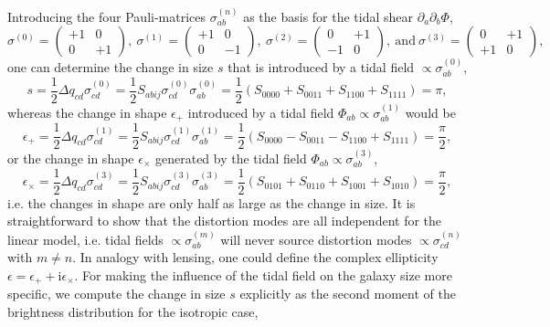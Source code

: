 \documentclass[a4paper,fleqn,usenatbib]{mnras}
\newcommand{\ci}{\mathrm{i}}
\begin{document}
Introducing the four Pauli-matrices $\sigma^{(n)}_{ab}$ as the basis for the tidal shear $\partial_a\partial_b\Phi$,
\begin{equation}
\sigma^{(0)} = \left(
\begin{array}{cc}
+1 & 0 \\ 0 & +1
\end{array}
\right),~
\sigma^{(1)} = \left(
\begin{array}{cc}
+1 & 0 \\ 0 & -1
\end{array}
\right),~
\sigma^{(2)} = \left(
\begin{array}{cc}
0 & +1 \\ -1 & 0
\end{array}
\right),
\mathrm{~and~}
\sigma^{(3)} = \left(
\begin{array}{cc}
0 & +1 \\ +1 & 0
\end{array}
\right),
\end{equation}
one can determine the change in size $s$ that is introduced by a tidal field $\propto\sigma_{ab}^{(0)}$,
\begin{equation}
s = 
\frac{1}{2}\Delta q_{cd}\sigma^{(0)}_{cd} = 
\frac{1}{2}S_{abij}\sigma^{(0)}_{cd}\sigma^{(0)}_{ab} = 
\frac{1}{2}\left(S_{0000} + S_{0011} + S_{1100} + S_{1111}\right) = 
\pi,
\end{equation}
whereas the change in shape $\epsilon_+$ introduced by a tidal field $\Phi_{ab}\propto\sigma^{(1)}_{ab}$ would be
\begin{equation}
\epsilon_+ = 
\frac{1}{2}\Delta q_{cd}\sigma^{(1)}_{cd} = 
\frac{1}{2}S_{abij}\sigma^{(1)}_{cd}\sigma^{(1)}_{ab} = 
\frac{1}{2}\left(S_{0000} - S_{0011} - S_{1100} + S_{1111}\right) =
\frac{\pi}{2},
\end{equation}
or the change in shape $\epsilon_\times$ generated by the tidal field $\Phi_{ab}\propto\sigma^{(3)}_{ab}$,
\begin{equation}
\epsilon_\times = 
\frac{1}{2}\Delta q_{cd}\sigma^{(3)}_{cd} =
\frac{1}{2}S_{abij}\sigma^{(3)}_{cd}\sigma^{(3)}_{ab} = 
\frac{1}{2}\left(S_{0101} + S_{0110} + S_{1001} + S_{1010}\right) = 
\frac{\pi}{2},
\end{equation}
i.e. the changes in shape are only half as large as the change in size. It is straightforward to show that the distortion modes are all independent for the linear model, i.e. tidal fields $\propto\sigma^{(m)}_{ab}$ will never source distortion modes $\propto\sigma^{(n)}_{cd}$ with $m\neq n$. In analogy with lensing, one could define the complex ellipticity $\epsilon = \epsilon_+ + \ci\epsilon_\times$. For making the influence of the tidal field on the galaxy size more specific, we compute the change in size $s$ explicitly as the second moment of the brightness distribution for the isotropic case,
\end{document}
